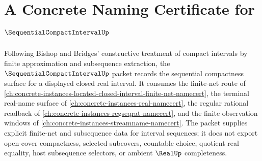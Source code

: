 \chapter{A Concrete Naming Certificate for $\SequentialCompactIntervalUp$}
\label{ch:concrete-instances-sequential-compact-interval-namecert}

Following Bishop and Bridges' constructive treatment of compact intervals by finite approximation and subsequence extraction, the $\SequentialCompactIntervalUp$ packet records the sequential compactness surface for a displayed closed real interval. It consumes the finite-net route of \autoref{ch:concrete-instances-located-closed-interval-finite-net-namecert}, the terminal real-name surface of \autoref{ch:concrete-instances-real-namecert}, the regular rational readback of \autoref{ch:concrete-instances-regseqrat-namecert}, and the finite observation windows of \autoref{ch:concrete-instances-streamname-namecert}. The packet supplies explicit finite-net and subsequence data for interval sequences; it does not export open-cover compactness, selected subcovers, countable choice, quotient real equality, host subsequence selectors, or ambient $\RealUp$ completeness.

